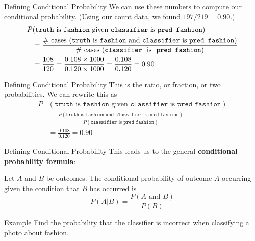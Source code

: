 \begin{frame}{Defining Conditional Probability} 
    We can use these numbers to compute our conditional probability. (Using our count data, we found $197/219=0.90$.)
    \begin{align*}
    P&(\texttt{truth} \text{ is } \texttt{fashion} \text{ given } \texttt{classifier} \text{ is } \texttt{pred fashion}) \\
    &= \frac{\# \text{ cases }(\texttt{truth} \text{ is } \texttt{fashion} \text{ and } \texttt{classifier} \text{ is } \texttt{pred fashion})}{\# \text{ cases (\texttt{classifier} \text{ is } \texttt{pred fashion})}} \\
    &= \frac{108}{120} = \frac{0.108\times1000}{0.120\times1000} = \frac{0.108}{0.120} = 0.90
    \end{align*}
\end{frame}

\begin{frame}{Defining Conditional Probability}
    This is the ratio, or fraction, or two probabilities. We can rewrite this as
    \begin{align*}
    P&(\texttt{truth} \text{ is } \texttt{fashion} \text{ given } \texttt{classifier} \text{ is } \texttt{pred fashion}) \\
    &= \frac{P(\texttt{truth} \text{ is } \texttt{fashion} \text{ and } \texttt{classifier} \text{ is } \texttt{pred fashion})}{P(\texttt{classifier} \text{ is } \texttt{pred fashion})} \\
    &= \frac{0.108}{0.120} = 0.90
    \end{align*}
\end{frame}

\begin{frame}{Defining Conditional Probability}
    This leads us to the general \textbf{conditional probability formula}:
    
    \vspace{12pt}Let $A$ and $B$ be outcomes. The conditional probability of outcome $A$ occurring given the condition that $B$ has occurred is
    \[
    P(A|B)=\frac{P(A\text{ and }B)}{P(B)}
    \]
\end{frame}

\begin{frame}{Example}
    Find the probability that the classifier is incorrect when classifying a photo about fashion.
\end{frame}

